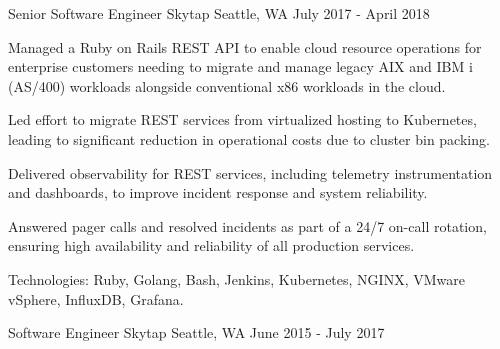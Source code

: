 \begin{cventries}
  \cventry
    {Senior Software Engineer} %
    {Skytap} %
    {Seattle, WA} %
    {July 2017 - April 2018} %
    {
      \begin{cvitems} %
        \item {Managed a Ruby on Rails REST API to enable cloud resource operations for enterprise customers needing to migrate and manage legacy AIX and IBM i (AS/400) workloads alongside conventional x86 workloads in the cloud.}
        \item {Led effort to migrate REST services from virtualized hosting to Kubernetes, leading to significant reduction in operational costs due to cluster bin packing.}
        \item {Delivered observability for REST services, including telemetry instrumentation and dashboards, to improve incident response and system reliability.}
        \item {Answered pager calls and resolved incidents as part of a 24/7 on-call rotation, ensuring high availability and reliability of all production services.}
        \item {Technologies: Ruby, Golang, Bash, Jenkins, Kubernetes, NGINX, VMware vSphere, InfluxDB, Grafana.}
      \end{cvitems}
    }

  \cventry
    {Software Engineer} %
    {Skytap} %
    {Seattle, WA} %
    {June 2015 - July 2017} %
    {}

\end{cventries}
